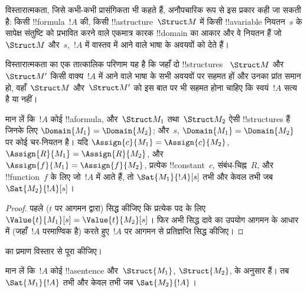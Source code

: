 \documentclass[../../../include/open-logic-section]{subfiles}
\begin{document}


\begin{explain}
विस्तारात्मकता, जिसे कभी-कभी प्रासंगिकता भी कहते हैं, अनौपचारिक रूप से इस
प्रकार कही जा सकती है: किसी !!{formula}~$!A$ की, किसी
!!a{structure}~$\Struct M$ में किसी !!a{variable} नियतन~$s$ के सापेक्ष
संतुष्टि को प्रभावित करने वाले एकमात्र कारक !!{domain} का आकार और वे नियतन हैं जो~$\Struct M$
और~$s$,~$!A$ में वास्तव में आने वाले भाषा के अवयवों को देते हैं।

विस्तारात्मकता का एक तात्कालिक परिणाम यह है कि जहाँ दो !!{structure}s
~$\Struct M$ और~$\Struct M'$ किसी वाक्य~$!A$ में आने वाले भाषा के सभी
अवयवों पर सहमत हों और उनका प्रांत समान हो, वहाँ~$\Struct M$ और~$\Struct M'$
को इस बात पर भी सहमत होना चाहिए कि स्वयं~$!A$ सत्य है या नहीं।
\end{explain}

\begin{prop}[विस्तारात्मकता]
  मान लें कि~$!A$ कोई !!a{formula}, और~$\Struct M_1$ तथा~$\Struct M_2$
  ऐसी !!{structure}s हैं जिनके लिए $\Domain{M_1} = \Domain{M_2}$; और~$s$,
  $\Domain{M_1} = \Domain{M_2}$ पर कोई चर-नियतन है। यदि
  $\Assign{c}{M_1} = \Assign{c}{M_2}$,
  $\Assign{R}{M_1}=\Assign{R}{M_2}$, और
  $\Assign{f}{M_1} = \Assign{f}{M_2}$, प्रत्येक !!{constant}~$c$,
  संबंध-चिह्न~$R$, और !!{function}~$f$ के लिए जो~$!A$ में आते हैं, तो
  $\Sat{M_1}{!A}[s]$ तभी और केवल
  तभी जब $\Sat{M_2}{!A}[s]$।
\end{prop}

\begin{proof}
  पहले ($t$ पर आगमन द्वारा) सिद्ध कीजिए कि प्रत्येक पद के लिए
  $\Value{t}{M_1}[s] = \Value{t}{M_2}[s]$। फिर अभी सिद्ध दावे का उपयोग
  आगमन के आधार में (जहाँ~$!A$ परमाण्विक है) करते हुए~$!A$ पर आगमन से
  प्रतिज्ञप्ति सिद्ध कीजिए।
\end{proof}

\begin{prob}
 का प्रमाण विस्तार से पूरा कीजिए।
\end{prob}

\begin{cor}
  मान लें कि~$!A$ कोई !!a{sentence} और~$\Struct{M_1}$, $\Struct{M_2}$,
   के अनुसार हैं। तब $\Sat{M_1}{!A}$ तभी और
  केवल तभी जब $\Sat{M_2}{!A}$।
\end{cor}
\end{document}
